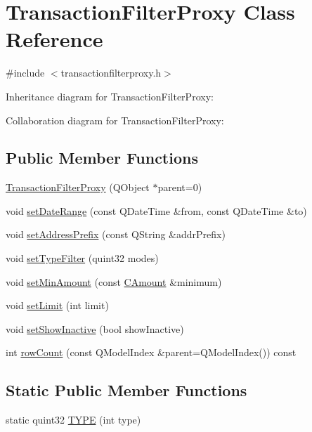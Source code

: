 \hypertarget{class_transaction_filter_proxy}{}\section{Transaction\+Filter\+Proxy Class Reference}
\label{class_transaction_filter_proxy}


{\ttfamily \#include $<$transactionfilterproxy.\+h$>$}



Inheritance diagram for Transaction\+Filter\+Proxy\+:


Collaboration diagram for Transaction\+Filter\+Proxy\+:
\subsection*{Public Member Functions}
\begin{DoxyCompactItemize}
\item 
\hyperlink{class_transaction_filter_proxy_a9981e03a2b60931e3e5adbe7e3fb6b7d}{Transaction\+Filter\+Proxy} (Q\+Object $\ast$parent=0)
\item 
void \hyperlink{class_transaction_filter_proxy_ad57cc552db9ce70bb4e8e1c12909992d}{set\+Date\+Range} (const Q\+Date\+Time \&from, const Q\+Date\+Time \&to)
\item 
void \hyperlink{class_transaction_filter_proxy_ad0b4258695ed1fbbf70d29f4e264361a}{set\+Address\+Prefix} (const Q\+String \&addr\+Prefix)
\item 
void \hyperlink{class_transaction_filter_proxy_af28eee58aee7585b71f057d044408106}{set\+Type\+Filter} (quint32 modes)
\item 
void \hyperlink{class_transaction_filter_proxy_a14688071f18551bf7d78225feb8ca8df}{set\+Min\+Amount} (const \hyperlink{amount_8h_a4eaf3a5239714d8c45b851527f7cb564}{C\+Amount} \&minimum)
\item 
void \hyperlink{class_transaction_filter_proxy_a3ec04a38573eb59b8f246f54658d2702}{set\+Limit} (int limit)
\item 
void \hyperlink{class_transaction_filter_proxy_aad1598cc4308eb08d8f617f08f62ece6}{set\+Show\+Inactive} (bool show\+Inactive)
\item 
int \hyperlink{class_transaction_filter_proxy_a606a2604ae4d991af677e6093701c8dc}{row\+Count} (const Q\+Model\+Index \&parent=Q\+Model\+Index()) const 
\end{DoxyCompactItemize}
\subsection*{Static Public Member Functions}
\begin{DoxyCompactItemize}
\item 
static quint32 \hyperlink{class_transaction_filter_proxy_aaacec79a6362b13ee4cfab7f770e33b5}{T\+Y\+P\+E} (int type)
\end{DoxyCompactItemize}
